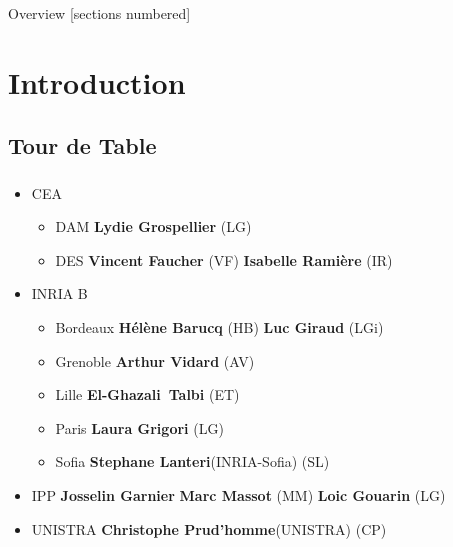 \titleframe

\begin{frame}{Overview}
  [sections numbered]
  \tableofcontents[hideallsubsections]
\end{frame}


\section{Introduction}
\subsection{Tour de Table}
\begin{frame}
  \frametitle{\insertsectionhead}
  \framesubtitle{\insertsubsectionhead}

  \begin{itemize}
    \item CEA 
    \begin{itemize}
      \item DAM \textbf{Lydie Grospellier} (LG)
      \item DES \textbf{Vincent Faucher} (VF) \textbf{Isabelle Ramière} (IR)  
    \end{itemize}
    \item INRIA B
    \begin{itemize}
      \item Bordeaux \textbf{Hélène Barucq} (HB) \textbf{Luc Giraud} (LGi)
      \item  Grenoble \textbf{Arthur Vidard} (AV)
      \item Lille \textbf{El-Ghazali Talbi} (ET)
      \item Paris \textbf{Laura Grigori} (LG)
      \item Sofia \textbf{Stephane Lanteri}(INRIA-Sofia) (SL) 
    \end{itemize}
    \item IPP \textbf{Josselin Garnier} \textbf{Marc Massot} (MM) \textbf{Loic Gouarin} (LG)
    \item UNISTRA \textbf{Christophe Prud'homme}(UNISTRA) (CP) 
  \end{itemize}
\end{frame}
